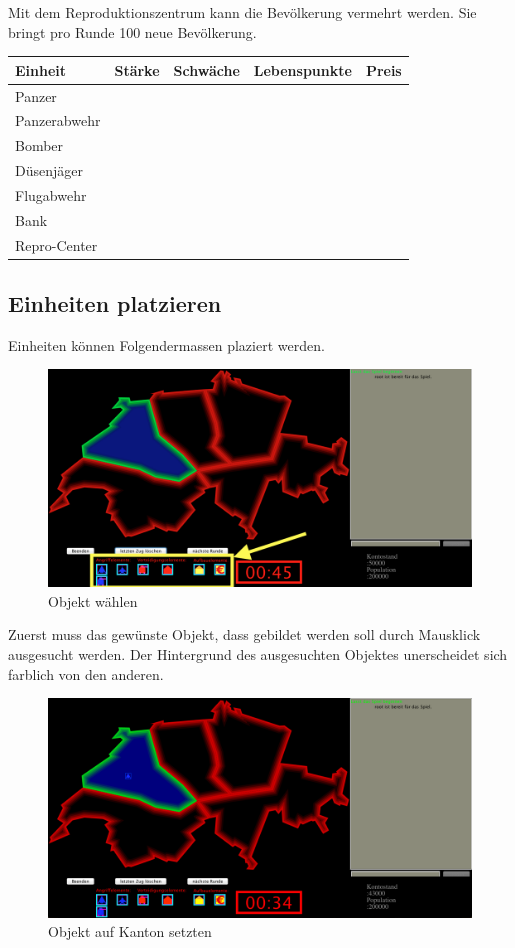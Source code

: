 \documentclass[ngerman, 12pt, pdftex]{scrartcl}[2006/07/30]
\begin{document}
Mit dem Reproduktionszentrum kann die Bevölkerung vermehrt werden. Sie bringt pro Runde 100 neue Bevölkerung.

\newpage

\begin{tabular}{l l l l l}
Einheit	&	Stärke	& Schwäche	& Lebenspunkte & Preis \\ \hline
Panzer  & & & & \\
Panzerabwehr  & & & & \\
Bomber & & & & \\
Düsenjäger & & & & \\
Flugabwehr & & & & \\
Bank & & & & \\
Repro-Center & & & & \\
\end{tabular}

\subsection{Einheiten platzieren}

Einheiten können Folgendermassen plaziert werden. 

\begin{figure}[h]
\centering
\includegraphics[scale=0.3]{spiel/Objekt_aussuchen.png}
\caption{Objekt wählen}
\end{figure}

Zuerst muss das gewünste Objekt, dass gebildet werden soll durch Mausklick ausgesucht werden. Der Hintergrund des ausgesuchten Objektes unerscheidet sich farblich von den anderen.

\begin{figure}[h]
\centering
\includegraphics[scale=0.3]{spiel/Objekt_setzen.png}
\caption{Objekt auf Kanton setzten}
\end{figure}
\end{document}
